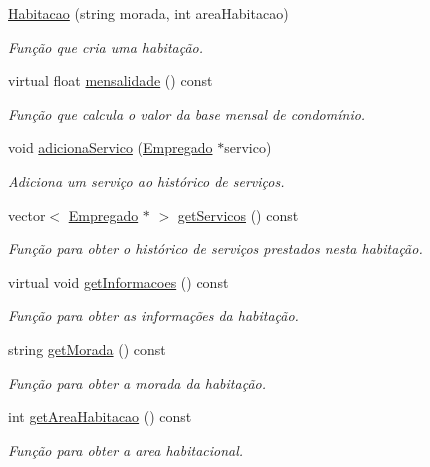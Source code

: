 \begin{DoxyCompactItemize}
\item 
\hyperlink{class_habitacao_a3b5e5edb0ca3b52025ef46a796fcf18d}{Habitacao} (string morada, int area\+Habitacao)
\begin{DoxyCompactList}\small\item\em Função que cria uma habitação. \end{DoxyCompactList}\item 
virtual float \hyperlink{class_habitacao_a479d2307661c87b05242b86ba849fb6e}{mensalidade} () const 
\begin{DoxyCompactList}\small\item\em Função que calcula o valor da base mensal de condomínio. \end{DoxyCompactList}\item 
void \hyperlink{class_habitacao_a2a8c7343f36b0d9415aef14b09bca511}{adiciona\+Servico} (\hyperlink{class_empregado}{Empregado} $\ast$servico)
\begin{DoxyCompactList}\small\item\em Adiciona um serviço ao histórico de serviços. \end{DoxyCompactList}\item 
vector$<$ \hyperlink{class_empregado}{Empregado} $\ast$ $>$ \hyperlink{class_habitacao_ae157cbc24ee34cd97c48eb6c114804e9}{get\+Servicos} () const 
\begin{DoxyCompactList}\small\item\em Função para obter o histórico de serviços prestados nesta habitação. \end{DoxyCompactList}\item 
virtual void \hyperlink{class_habitacao_a87cf4e8f900eb5d28bf9178f187f83af}{get\+Informacoes} () const 
\begin{DoxyCompactList}\small\item\em Função para obter as informações da habitação. \end{DoxyCompactList}\item 
string \hyperlink{class_habitacao_a17ef78eef7746f92bd2814893bfafbab}{get\+Morada} () const 
\begin{DoxyCompactList}\small\item\em Função para obter a morada da habitação. \end{DoxyCompactList}\item 
int \hyperlink{class_habitacao_a8b8dc61b41f3bda37f3e517fe63f877a}{get\+Area\+Habitacao} () const 
\begin{DoxyCompactList}\small\item\em Função para obter a area habitacional. \end{DoxyCompactList}\item 

\end{DoxyCompactItemize}
